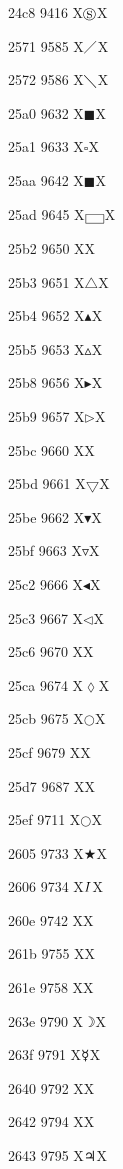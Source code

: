 \documentclass[11pt]{article}
\begin{document}
24c8 9416 X{\ensuremath{\circledS}}X

2571 9585 X{\ensuremath{\diagup}}X

2572 9586 X{\ensuremath{\diagdown}}X

25a0 9632 X{\ensuremath{\blacksquare}}X

25a1 9633 X{\ensuremath{\square}}X

25aa 9642 X{\ensuremath{\blacksquare}}X

25ad 9645 X{\ensuremath{\fbox{~~}}}X

25b2 9650 X{}X

25b3 9651 X{\ensuremath{\bigtriangleup}}X

25b4 9652 X{\ensuremath{\blacktriangle}}X

25b5 9653 X{\ensuremath{\vartriangle}}X

25b8 9656 X{\ensuremath{\blacktriangleright}}X

25b9 9657 X{\ensuremath{\triangleright}}X

25bc 9660 X{}X

25bd 9661 X{\ensuremath{\bigtriangledown}}X

25be 9662 X{\ensuremath{\blacktriangledown}}X

25bf 9663 X{\ensuremath{\triangledown}}X

25c2 9666 X{\ensuremath{\blacktriangleleft}}X

25c3 9667 X{\ensuremath{\triangleleft}}X

25c6 9670 X{}X

25ca 9674 X{\ensuremath{\lozenge}}X

25cb 9675 X{\ensuremath{\bigcirc}}X

25cf 9679 X{}X

25d7 9687 X{}X

25ef 9711 X{\ensuremath{\bigcirc}}X

2605 9733 X{\ensuremath{\bigstar}}X

2606 9734 X{\ensuremath{\ding{73}}}X

260e 9742 X{}X

261b 9755 X{}X

261e 9758 X{}X

263e 9790 X{\ensuremath{\rightmoon}}X

263f 9791 X{\ensuremath{\mercury}}X

2640 9792 X{\venus}X

2642 9794 X{\male}X

2643 9795 X{\ensuremath{\jupiter}}X
\end{document}
